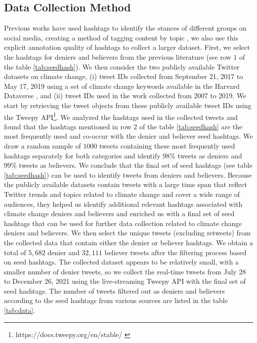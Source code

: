 \documentclass[letterpaper]{article}
\begin{document}
\subsection{Data Collection Method}\label{data_collect}

Previous works have used hashtags to identify the stances of different groups on social media, creating a method of tagging content by topic \cite{misra-etal-2016-nlds}, we also use this explicit annotation quality of hashtags to collect a larger dataset. First, we select the hashtags for deniers and believers \cite{tyagi2020polarizing} from the previous literature (see row $1$ of the table \ref{tab:seedhash}). We then consider the two publicly available Twitter datasets on climate change, (i) tweet IDs collected from September 21, 2017 to May 17, 2019 using a set of climate change keywords available in the Harvard Dataverse \cite{DVN/5QCCUU_2019}, and (ii) tweet IDs used in the work \cite{samantray2019credibility} collected from 2007 to 2019. We start by retrieving the tweet objects from these publicly available tweet IDs using the Tweepy API\footnote{https://docs.tweepy.org/en/stable/ \label{tweepy}}. We analyzed the hashtags used in the collected tweets and found that the hashtags mentioned in row $2$ of the table \ref{tab:seedhash} are the most frequently used and co-occur with the denier and believer seed hashtags. We draw a random sample of $1000$ tweets containing these most frequently used hashtags separately for both categories and identify $98\%$ tweets as deniers and $99\%$ tweets as believers. We conclude that the final set of seed hashtags (see table \ref{tab:seedhash}) can be used to identify tweets from deniers and believers. %
Because the publicly available datasets contain tweets with a large time span that reflect Twitter trends and topics related to climate change and cover a wide range of audiences, they helped us identify additional relevant hashtags associated with climate change deniers and believers and enriched us with a final set of seed hashtags that can be used for further data collection related to climate change deniers and believers. We then select the unique tweets (excluding retweets) from the collected data that contain either the denier or believer hashtags. We obtain a total of $5,682$ denier and $32,111$ believer tweets after the filtering process based on seed hashtags. %
The collected dataset appears to be relatively small, with a smaller number of denier tweets, so we collect the real-time tweets from July 28 to December 26, 2021 using the live-streaming Tweepy API with the final set of seed hashtags. The number of tweets filtered out as deniers and believers according to the seed hashtags from various sources are listed in the table \ref{tab:data}.
\end{document}
